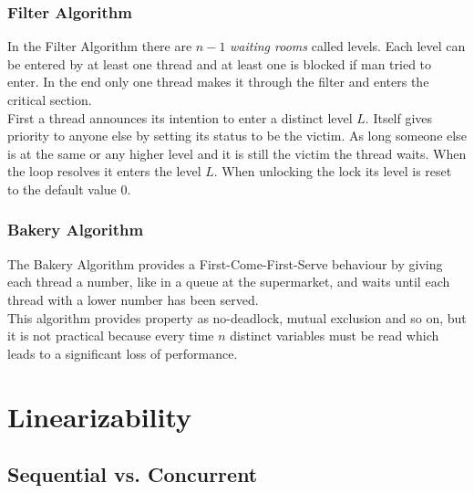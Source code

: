 \documentclass{article}
\begin{document}
\begin{adjustwidth}{2em}{2em}
\begin{adjustwidth}{2em}{2em}
			\subsubsection{Filter Algorithm}
			\begin{adjustwidth}{1em}{}
				In the Filter Algorithm there are $n-1$ \textit{waiting rooms} called levels. Each level can be entered by at least one thread and at least one is blocked if man tried to enter. In the end only one thread makes it through the filter and enters the critical section. \\
				First a thread announces its intention to enter a distinct level $L$. Itself gives priority to anyone else by setting its status to be the victim. As long someone else is at the same or any higher level and it is still the victim the thread waits. When the loop resolves it enters the level $L$. When unlocking the lock its level is reset to the default value $0$.
			\end{adjustwidth}
			\subsubsection{Bakery Algorithm}
			\begin{adjustwidth}{1em}{}
				The Bakery Algorithm provides a First-Come-First-Serve behaviour by giving each thread a number, like in a queue at the supermarket, and waits until each thread with a lower number has been served. \\
				This algorithm provides property as no-deadlock, mutual exclusion and so on, but it is not practical because every time $n$ distinct variables must be read which leads to a significant loss of performance.
			\end{adjustwidth}
		\end{adjustwidth}
	\end{adjustwidth}
	
	\section{Linearizability}
	\begin{adjustwidth}{2em}{2em}
		\subsection{Sequential vs. Concurrent}
		\begin{adjustwidth}{2em}{2em}
		\end{adjustwidth}
	\end{adjustwidth}
\end{document}
